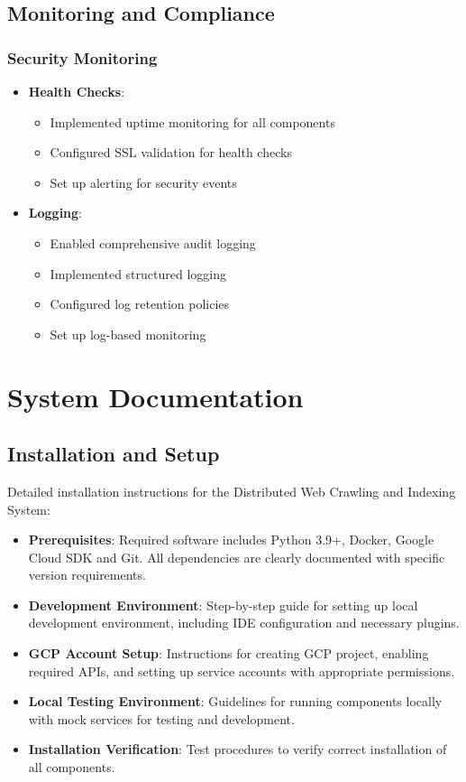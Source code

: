 \documentclass[12pt,a4paper]{report}
\begin{document}
\section{Monitoring and Compliance}

\subsection{Security Monitoring}
\begin{itemize}
\item \textbf{Health Checks}:
    \begin{itemize}
        \item Implemented uptime monitoring for all components
        \item Configured SSL validation for health checks
        \item Set up alerting for security events
    \end{itemize}
\item \textbf{Logging}:
    \begin{itemize}
        \item Enabled comprehensive audit logging
        \item Implemented structured logging
        \item Configured log retention policies
        \item Set up log-based monitoring
    \end{itemize}
\end{itemize}

\chapter{System Documentation}

\section{Installation and Setup}
Detailed installation instructions for the Distributed Web Crawling and Indexing System:
\begin{itemize}
    \item \textbf{Prerequisites}: Required software includes Python 3.9+, Docker, Google Cloud SDK and Git. All dependencies are clearly documented with specific version requirements.
    \item \textbf{Development Environment}: Step-by-step guide for setting up local development environment, including IDE configuration and necessary plugins.
    \item \textbf{GCP Account Setup}: Instructions for creating GCP project, enabling required APIs, and setting up service accounts with appropriate permissions.
    \item \textbf{Local Testing Environment}: Guidelines for running components locally with mock services for testing and development.
    \item \textbf{Installation Verification}: Test procedures to verify correct installation of all components.
\end{itemize}
\end{document}
